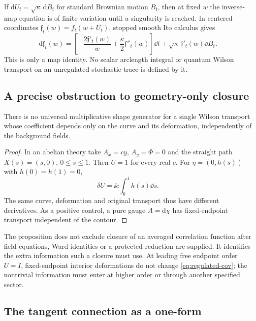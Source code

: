 If $\mathrm dU_t=\sqrt\kappa\,\mathrm dB_t$ for standard Brownian motion
$B_t$, then at fixed $w$ the inverse-map equation is of finite variation
until a singularity is reached. In centered coordinates
$\mathfrak f_t(w)=f_t(w+U_t)$, stopped smooth Ito calculus gives
\begin{equation}\label{eq:ito}
 \mathrm d\mathfrak f_t(w)=
 \left[-\frac{2\mathfrak f'_t(w)}w+\frac\kappa2\mathfrak f''_t(w)\right]\dd t
 +\sqrt\kappa\,\mathfrak f'_t(w)\dd B_t.
\end{equation}
This is only a map identity. No scalar arclength integral or quantum
Wilson transport on an unregulated stochastic trace is defined by it.

\subsection{A precise obstruction to geometry-only closure}

\begin{proposition}\label{prop:no-closure}
There is no universal multiplicative shape generator for a single
Wilson transport whose coefficient depends only on the curve and its
deformation, independently of the background fields.
\end{proposition}
\begin{proof}
In an abelian theory take $A_x=cy$, $A_y=\Phi=0$ and the straight path
$X(s)=(s,0)$, $0\leq s\leq1$. Then $U=1$ for every real $c$.
For $\eta=(0,h(s))$ with $h(0)=h(1)=0$,
\begin{equation}
 \delta U=\ii c\int_0^1h(s)\dd s.
\end{equation}
The same curve, deformation and original transport thus have different
derivatives. As a positive control, a pure gauge $A=\mathrm d\chi$
has fixed-endpoint transport independent of the contour.
\end{proof}
The proposition does not exclude closure of an averaged correlation
function after field equations, Ward identities or a protected
reduction are supplied. It identifies the extra information such a
closure must use. At leading free endpoint order $U=I$, fixed-endpoint
interior deformations do not change \eqref{eq:regulated-cov}; the
nontrivial information must enter at higher order or through another
specified sector.

\subsection{The tangent connection as a one-form}

